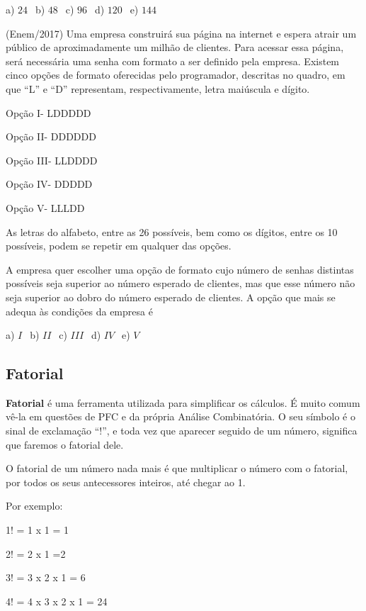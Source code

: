 \begin{multicols*}{2}
		      a) $24 \ \ $ b) $48 \ \ $ c) $96 \ \ $ d) $120 \ \ $ e) $144 \ \ $

		\execnum (Enem/2017) Uma empresa construirá sua página na internet e espera atrair um público de aproximadamente um milhão de clientes. Para acessar essa página, será necessária uma senha com formato a ser definido pela empresa. Existem cinco opções de formato oferecidas pelo programador, descritas no quadro, em que “L” e “D” representam, respectivamente, letra maiúscula e dígito.

		      Opção I- LDDDDD

		      Opção II- DDDDDD

		      Opção III- LLDDDD

		      Opção IV- DDDDD

		      Opção V- LLLDD

		      As letras do alfabeto, entre as 26 possíveis, bem como os dígitos, entre os 10 possíveis, podem se repetir em qualquer das opções.

		      A empresa quer escolher uma opção de formato cujo número de senhas distintas possíveis seja superior ao número esperado de clientes, mas que esse número não seja superior ao dobro do número esperado de clientes.
		      A opção que mais se adequa às condições da empresa é

		      a) $ I \ \ $ b) $II \ \ $ c) $III \ \ $ d) $IV \ \ $ e) $V \ \ $


	\subsection{Fatorial}

	\textbf{Fatorial} é uma ferramenta utilizada para simplificar os cálculos. É muito comum vê-la em questões de PFC e da própria Análise Combinatória. O seu símbolo é o sinal de exclamação “!”, e toda vez que aparecer seguido de um número, significa que faremos o fatorial dele.

	O fatorial de um número nada mais é que multiplicar o número com o fatorial, por todos os seus antecessores inteiros, até chegar ao 1.

	Por exemplo:

	1! = 1 x 1 = 1

	2! = 2 x 1 =2

	3! = 3 x 2 x 1 = 6

	4! = 4 x 3 x 2 x 1 = 24


\end{multicols*}
